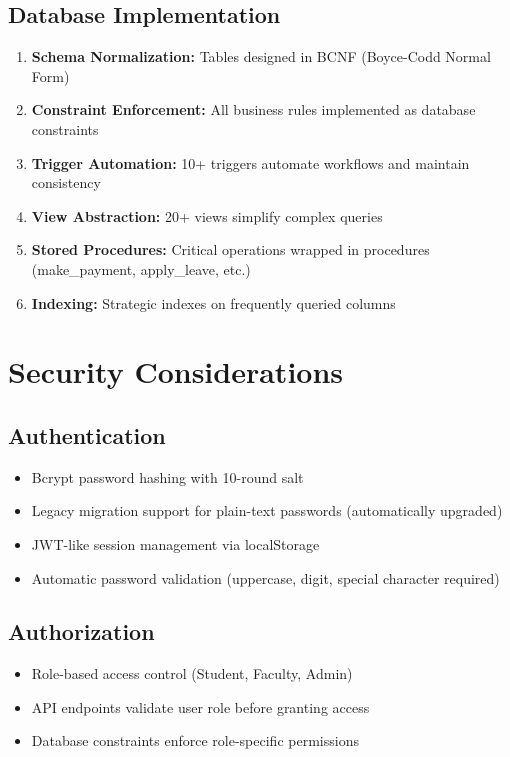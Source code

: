 \documentclass[12pt]{article}
\begin{document}
\subsection{Database Implementation}

\begin{enumerate}
    \item \textbf{Schema Normalization:} Tables designed in BCNF (Boyce-Codd Normal Form)
    \item \textbf{Constraint Enforcement:} All business rules implemented as database constraints
    \item \textbf{Trigger Automation:} 10+ triggers automate workflows and maintain consistency
    \item \textbf{View Abstraction:} 20+ views simplify complex queries
    \item \textbf{Stored Procedures:} Critical operations wrapped in procedures (make\_payment, apply\_leave, etc.)
    \item \textbf{Indexing:} Strategic indexes on frequently queried columns
\end{enumerate}

\newpage

\section{Security Considerations}

\subsection{Authentication}

\begin{itemize}
    \item Bcrypt password hashing with 10-round salt
    \item Legacy migration support for plain-text passwords (automatically upgraded)
    \item JWT-like session management via localStorage
    \item Automatic password validation (uppercase, digit, special character required)
\end{itemize}

\subsection{Authorization}

\begin{itemize}
    \item Role-based access control (Student, Faculty, Admin)
    \item API endpoints validate user role before granting access
    \item Database constraints enforce role-specific permissions
\end{itemize}
\end{document}
